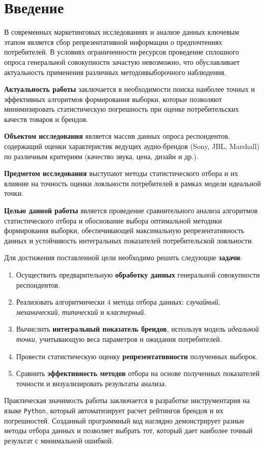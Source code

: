 \section*{Введение}

В современных маркетинговых исследованиях и анализе данных ключевым этапом является
сбор репрезентативной информации о предпочтениях потребителей. В условиях
ограниченности ресурсов проведение сплошного опроса генеральной совокупности
зачастую невозможно, что обуславливает актуальность применения различных
методоввыборочного наблюдения.

\textbf{Актуальность работы} заключается в необходимости поиска наиболее точных и
эффективных алгоритмов формирования выборки, которые позволяют минимизировать статистическую
погрешность при оценке потребительских качеств товаров и брендов.

\textbf{Объектом исследования} является массив данных опроса респондентов, содержащий
оценки характеристик ведущих аудио-брендов (Sony, JBL, Marshall) по различным критериям (качество звука, цена, дизайн и др.).

\textbf{Предметом исследования} выступают методы статистического отбора и их влияние
на точность оценки лояльности потребителей в рамках модели идеальной точки.

\textbf{Целью данной работы} является проведение сравнительного анализа алгоритмов
статистического отбора и обоснование выбора оптимальной методики формирования выборки,
обеспечивающей максимальную репрезентативность данных и устойчивость интегральных
показателей потребительской лояльности.

Для достижения поставленной цели необходимо решить следующие \textbf{задачи}:
\begin{enumerate}
    \item Осуществить предварительную \textbf{обработку данных} генеральной совокупности 
    респондентов.
    \item Реализовать алгоритмически $4$ метода отбора данных: \emph{случайный},
    \emph{механический}, \emph{типический} и \emph{кластерный}.
    \item Вычислить \textbf{интегральный показатель брендов}, используя модель 
    \emph{идеальной точки}, учитывающую веса параметров и ожидания потребителей.
    \item Провести статистическую оценку \textbf{репрезентативности} полученных выборок.
    \item Сравнить \textbf{эффективность методов} отбора на основе полученных
    показателей точности и визуализировать результаты анализа.
\end{enumerate}

Практическая значимость работы заключается в разработке инструментария 
на языке \texttt{Python}, который автоматизирует расчет рейтингов брендов 
и их погрешностей. Созданный программный код наглядно демонстрирует
разные методы отбора данных и позволяет выбрать тот, который дает наиболее точный результат
с минимальной ошибкой.